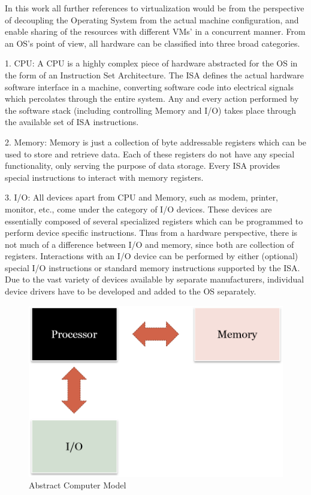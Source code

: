 In this work all further references to virtualization would be from the perspective of decoupling the Operating System from the actual machine configuration, and enable sharing of the resources with different VMs’ in a concurrent manner. From an OS's point of view, all hardware can be classified into three broad categories.

1. CPU: A CPU is a highly complex piece of hardware abstracted for the OS in the form of an Instruction Set Architecture. The ISA defines the actual hardware software interface in a machine, converting software code into electrical signals which percolates through the entire system. Any and every action performed by the software stack (including controlling Memory and I/O) takes place through the available set of ISA instructions.

2. Memory: Memory is just a collection of byte addressable registers which can be used to store and retrieve data. Each of these registers do not have any special functionality, only serving the purpose of data storage. Every ISA provides special instructions to interact with memory registers.

3. I/O: All devices apart from CPU and Memory, such as modem, printer, monitor, etc., come under the category of I/O devices. These devices are essentially composed of several specialized registers which can be programmed to perform device specific instructions. Thus from a hardware perspective, there is not much of a difference between I/O and memory, since both are collection of registers. Interactions with an I/O device can be performed by either (optional) special I/O instructions or standard memory instructions supported by the ISA. Due to the vast variety of devices available by separate manufacturers, individual device drivers have to be developed and added to the OS separately. 


\setlength{\belowcaptionskip}{-10pt}

\begin{figure}[H]
  \centering
  \includegraphics[scale=0.6]{figures/Mem_IO_CPU.png}
  \caption{Abstract Computer Model}
  \label{fig:mem_io}
\end{figure}

